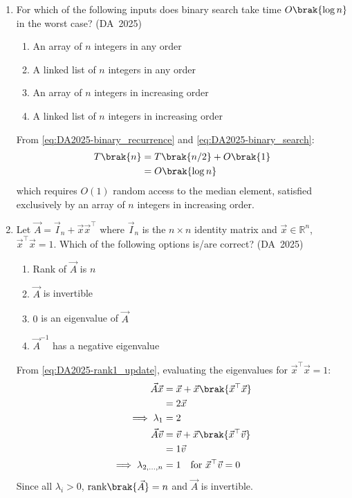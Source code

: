 \begin{enumerate}[label=\thesubsection.\arabic*, ref=\thesubsection.\theenumi]
	\item 
	For which of the following inputs does binary search take time $O\brak{\log n}$ in the worst case?
	\hfill (DA~2025)
	\begin{enumerate}
		\item An array of $n$ integers in any order
		\item A linked list of $n$ integers in any order
		\item An array of $n$ integers in increasing order
		\item A linked list of $n$ integers in increasing order
	\end{enumerate}
	\solution
	From \eqref{eq:DA2025-binary_recurrence} and \eqref{eq:DA2025-binary_search}:
	\begin{align}
		T\brak{n} &= T\brak{n/2} + O\brak{1}
		\\
		&= O\brak{\log n}
	\end{align}
	which requires $O(1)$ random access to the median element, satisfied exclusively by an array of $n$ integers in increasing order.
	
	\item 
	Let $\vec{A} = \vec{I}_n + \vec{x}\vec{x}^{\top}$ where $\vec{I}_n$ is the $n \times n$ identity matrix and $\vec{x} \in \mathbb{R}^n$, $\vec{x}^{\top}\vec{x} = 1$. Which of the following options is/are correct?
	\hfill (DA~2025)
	\begin{enumerate}
		\item Rank of $\vec{A}$ is $n$
		\item $\vec{A}$ is invertible
		\item $0$ is an eigenvalue of $\vec{A}$
		\item $\vec{A}^{-1}$ has a negative eigenvalue
	\end{enumerate}
	\solution
	From \eqref{eq:DA2025-rank1_update}, evaluating the eigenvalues for $\vec{x}^\top\vec{x} = 1$:
	\begin{align}
		\vec{A}\vec{x} &= \vec{x} + \vec{x}\brak{\vec{x}^\top\vec{x}}
		\\
		&= 2\vec{x}
		\\
		\implies \lambda_1 &= 2
		\\
		\vec{A}\vec{v} &= \vec{v} + \vec{x}\brak{\vec{x}^\top\vec{v}}
		\\
		&= 1\vec{v}
		\\
		\implies \lambda_{2,\dots,n} &= 1 \quad \text{for } \vec{x}^\top\vec{v} = 0
	\end{align}
	Since all $\lambda_i > 0$, $\text{rank}\brak{\vec{A}} = n$ and $\vec{A}$ is invertible.
	

\end{enumerate}
